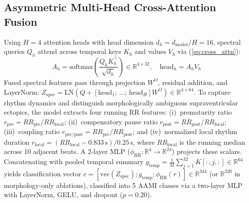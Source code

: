 \documentclass[conference]{IEEEtran}
\begin{document}
\subsection{Asymmetric Multi-Head Cross-Attention Fusion}
Using $H = 4$ attention heads with head dimension $d_h = d_{\text{model}} / H = 16$, spectral queries $Q_h$ attend across temporal keys $K_h$ and values $V_h$ via (\ref{eq:cross_attn}):
\begin{equation}
A_h = \mathrm{softmax}\left(\frac{Q_h K_h^\top}{\sqrt{d_h}}\right) \in \mathbb{R}^{4 \times 32}, \quad \mathrm{head}_h = A_h V_h
\label{eq:cross_attn}
\end{equation}
Fused spectral features pass through projection $W^O$, residual addition, and LayerNorm: $Z_{\text{spec}} = \mathrm{LN}(Q + [\mathrm{head}_1; \, \dots; \, \mathrm{head}_H] W^O) \in \mathbb{R}^{4 \times 64}$. To capture rhythm dynamics and distinguish morphologically ambiguous supraventricular ectopics, the model extracts four running RR features: (i)~prematurity ratio $r_{\text{pre}} = RR_{\text{pre}} / RR_{\text{local}}$; (ii)~compensatory pause ratio $r_{\text{post}} = RR_{\text{post}} / RR_{\text{local}}$; (iii)~coupling ratio $r_{\text{pre/post}} = RR_{\text{pre}} / RR_{\text{post}}$; and (iv)~normalized local rhythm duration $r_{\text{local}} = (RR_{\text{local}} - 0.833\,\text{s}) / 0.25\,\text{s}$, where $RR_{\text{local}}$ is the running median across 10 adjacent beats. A 2-layer MLP ($\phi_{\text{RR}}: \mathbb{R}^4 \to \mathbb{R}^{24}$) projects these scalars. Concatenating with pooled temporal summary $g_{\text{temp}} = \frac{1}{32} \sum_{j=1}^{32} K[:, j, :] \in \mathbb{R}^{64}$ yields classification vector $c = [\mathrm{vec}(Z_{\text{spec}}); g_{\text{temp}}; \phi_{\text{RR}}(r)] \in \mathbb{R}^{344}$ (or $\mathbb{R}^{320}$ in morphology-only ablations), classified into 5 AAMI classes via a two-layer MLP with LayerNorm, GELU, and dropout ($p=0.20$).
\end{document}
